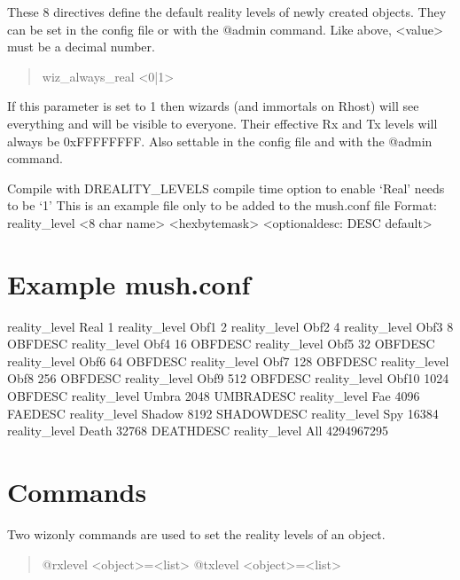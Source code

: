 \documentclass[letterpaper,10pt,english]{sphinxmanual}
\begin{document}
\sphinxAtStartPar
These 8 directives define the default reality levels of newly created
objects. They can be set in the config file or with the @admin command.
Like above, \textless{}value\textgreater{} must be a decimal number.
\begin{quote}

\sphinxAtStartPar
wiz\_always\_real \textless{}0|1\textgreater{}
\end{quote}

\sphinxAtStartPar
If this parameter is set to 1 then wizards (and immortals on Rhost) will see
everything and will be visible to everyone. Their effective Rx and Tx levels
will always be 0xFFFFFFFF. Also settable in the config file and with the
@admin command.

\sphinxAtStartPar
Compile with \sphinxhyphen{}DREALITY\_LEVELS compile time option to enable ‘Real’ needs to be ‘1’
This is an example file only to be added to the mush.conf file
Format: reality\_level \textless{}8 char name\textgreater{} \textless{}hex\sphinxhyphen{}byte\sphinxhyphen{}mask\textgreater{} \textless{}optional\sphinxhyphen{}desc: DESC default\textgreater{}


\section{Example mush.conf}
\label{\detokenize{19-reality:example-mush-conf}}
\sphinxAtStartPar
reality\_level Real 1
reality\_level Obf1 2
reality\_level Obf2 4
reality\_level Obf3 8 OBFDESC
reality\_level Obf4 16 OBFDESC
reality\_level Obf5 32 OBFDESC
reality\_level Obf6 64 OBFDESC
reality\_level Obf7 128 OBFDESC
reality\_level Obf8 256 OBFDESC
reality\_level Obf9 512 OBFDESC
reality\_level Obf10 1024 OBFDESC
reality\_level Umbra 2048 UMBRADESC
reality\_level Fae 4096 FAEDESC
reality\_level Shadow 8192 SHADOWDESC
reality\_level Spy 16384
reality\_level Death 32768 DEATHDESC
reality\_level All 4294967295


\section{Commands}
\label{\detokenize{19-reality:commands}}
\sphinxAtStartPar
Two wiz\sphinxhyphen{}only commands are used to set the reality levels of an object.
\begin{quote}

\sphinxAtStartPar
@rxlevel \textless{}object\textgreater{}=\textless{}list\textgreater{}
@txlevel \textless{}object\textgreater{}=\textless{}list\textgreater{}
\end{quote}
\end{document}
